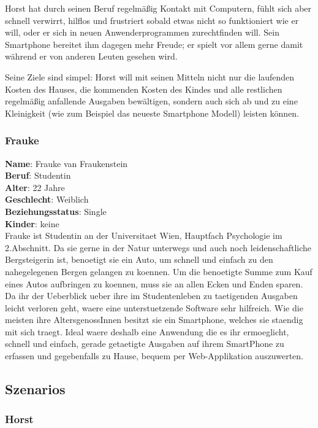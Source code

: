 Horst hat durch seinen Beruf regelm\"a\ss ig Kontakt mit Computern, f\"uhlt sich aber schnell verwirrt, hilflos und
frustriert sobald etwas nicht so funktioniert wie er will, oder er sich in neuen Anwenderprogrammen zurechtfinden will.
Sein Smartphone bereitet ihm dagegen mehr Freude; er spielt vor allem gerne damit w\"ahrend
er von anderen Leuten gesehen wird.

Seine Ziele sind simpel: Horst will mit seinen Mitteln nicht nur die laufenden Kosten des Hauses,
die kommenden Kosten des Kindes und alle restlichen regelm\"a\ss ig anfallende Ausgaben bew\"altigen,
sondern auch sich ab und zu eine Kleinigkeit (wie zum Beispiel das neueste Smartphone Modell) leisten k\"onnen.

\newpage
\subsubsection{Frauke}

\textbf{Name}: Frauke van Fraukenstein \\
\textbf{Beruf}: Studentin \\
\textbf{Alter}: 22 Jahre \\
\textbf{Geschlecht}: Weiblich \\
\textbf{Beziehungsstatus}: Single \\
\textbf{Kinder}: keine \\

Frauke ist Studentin an der Universitaet Wien, Hauptfach Psychologie im 2.Abschnitt.
Da sie gerne in der Natur unterwegs und auch noch leidenschaftliche Bergsteigerin ist,
benoetigt sie ein Auto, um schnell und einfach zu den nahegelegenen Bergen gelangen
zu koennen. Um die benoetigte Summe zum Kauf eines Autos aufbringen zu koennen, muss
sie an allen Ecken und Enden sparen. Da ihr der Ueberblick ueber ihre im Studentenleben
zu taetigenden Ausgaben leicht verloren geht, waere eine unterstuetzende Software sehr
hilfreich. Wie die meisten ihre AltersgenossInnen besitzt sie ein Smartphone, welches
sie staendig mit sich traegt. Ideal waere deshalb eine Anwendung die es ihr ermoeglicht,
schnell und einfach, gerade getaetigte Ausgaben auf ihrem SmartPhone zu erfassen und
gegebenfalls zu Hause, bequem per Web-Applikation auszuwerten.

\subsection{Szenarios}

\subsubsection{Horst}

